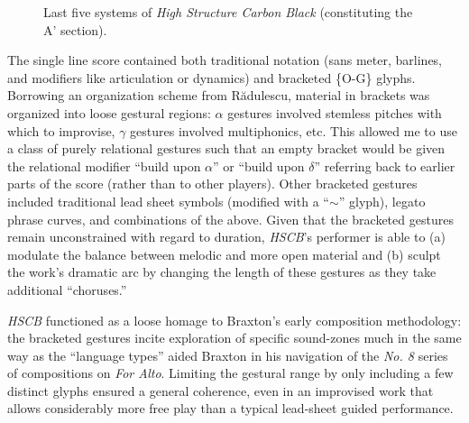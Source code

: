         \begin{figure}
            \centering
            \captionsetup{width=.5\textwidth}
            \caption{Last five systems of \textit{High Structure Carbon Black} (constituting the A' section).}
            \label{fig:hscbexcerpt}
        \end{figure}

    The single line score contained both traditional notation (sans meter, barlines, and modifiers like articulation or dynamics) and bracketed \{O-G\} glyphs. Borrowing an organization scheme from R\u{a}dulescu, material in brackets was organized into loose gestural regions: $\alpha$ gestures involved stemless pitches with which to improvise, $\gamma$ gestures involved multiphonics, etc. This allowed me to use a class of purely relational gestures such that an empty bracket would be given the relational modifier ``build upon $\alpha$'' or ``build upon $\delta$'' referring back to earlier parts of the score (rather than to other players). Other bracketed gestures included traditional lead sheet symbols (modified with a ``$\sim$'' glyph), legato phrase curves, and combinations of the above. Given that the bracketed gestures remain unconstrained with regard to duration, \textit{HSCB}'s performer is able to (a) modulate the balance between melodic and more open material and (b) sculpt the work's dramatic arc by changing the length of these gestures as they take additional ``choruses.''

    \textit{HSCB} functioned as a loose homage to Braxton's early composition methodology: the bracketed gestures incite exploration of specific sound-zones much in the same way as the ``language types'' aided Braxton in his navigation of the \textit{No. 8} series of compositions on \textit{For Alto}. Limiting the gestural range by only including a few distinct glyphs ensured a general coherence, even in an improvised work that allows considerably more free play than a typical lead-sheet guided performance. 

